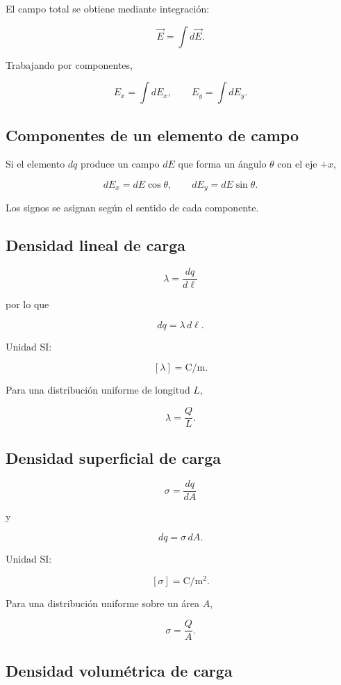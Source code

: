 El campo total se obtiene mediante integración:

\[
\boxed{\vec E=\int d\vec E}.
\]

Trabajando por componentes,

\[
\boxed{E_x=\int dE_x},
\qquad
\boxed{E_y=\int dE_y}.
\]


\subsection{Componentes de un elemento de campo}

Si el elemento \(dq\) produce un campo \(dE\) que forma un ángulo \(\theta\) con el eje \(+x\),

\[
\boxed{dE_x=dE\cos\theta},
\qquad
\boxed{dE_y=dE\sin\theta}.
\]

Los signos se asignan según el sentido de cada componente.


\subsection{Densidad lineal de carga}

\[
\boxed{\lambda=\frac{dq}{d\ell}}
\]

por lo que

\[
\boxed{dq=\lambda\,d\ell}.
\]

Unidad SI:

\[
\boxed{[\lambda]=\si{\coulomb\per\metre}}.
\]

Para una distribución uniforme de longitud \(L\),

\[
\boxed{\lambda=\frac{Q}{L}}.
\]


\subsection{Densidad superficial de carga}

\[
\boxed{\sigma=\frac{dq}{dA}}
\]

y

\[
\boxed{dq=\sigma\,dA}.
\]

Unidad SI:

\[
\boxed{[\sigma]=\si{\coulomb\per\metre\squared}}.
\]

Para una distribución uniforme sobre un área \(A\),

\[
\boxed{\sigma=\frac{Q}{A}}.
\]


\subsection{Densidad volumétrica de carga}

